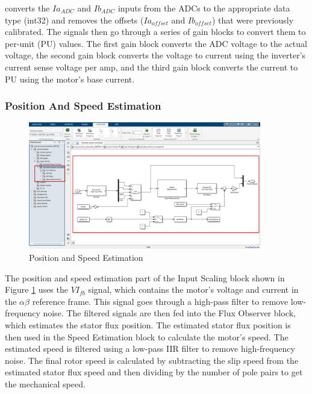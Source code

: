 converts the $Ia_{ADC}$ and $Ib_{ADC}$ inputs from the ADCs to the appropriate data type (int32) and removes the offsets ($Ia_{offset}$ and $Ib_{offset}$) that were previously calibrated. The signals then go through a series of gain blocks to convert them to per-unit (PU) values. The first gain block converts the ADC voltage to the actual voltage, the second gain block converts the voltage to current using the inverter's current sense voltage per amp, and the third gain block converts the current to PU using the motor's base current.


\subsubsection{Position And Speed Estimation}



\begin{figure}[H]
	\centering
	\includegraphics[width=4in]{sections/section3/images/simulation/inputScaling/fluxObserver.png}
	\caption{Position and Speed Estimation}
	\label{fig:position_speed_estimation}
\end{figure}


The position and speed estimation part of the Input Scaling block shown in  Figure \ref{fig:position_speed_estimation} uses the $VI_{fb}$ signal, which contains the motor's voltage and current in the $\alpha \beta$ reference frame. This signal goes through a high-pass filter to remove low-frequency noise. The filtered signals are then fed into the Flux Observer block, which estimates the stator flux position. The estimated stator flux position is then used in the Speed Estimation block to calculate the motor's speed. The estimated speed is filtered using a low-pass IIR filter to remove high-frequency noise. The final rotor speed is calculated by subtracting the slip speed from the estimated stator flux speed and then dividing by the number of pole pairs to get the mechanical speed.

